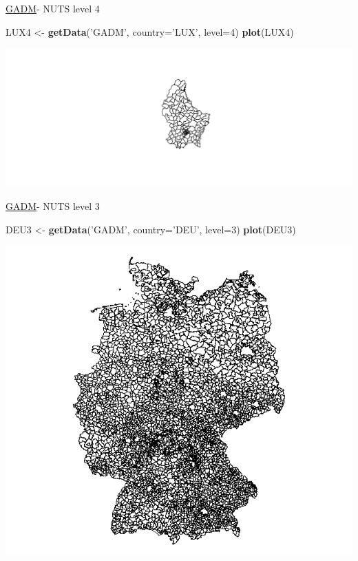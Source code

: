 \documentclass[ignorenonframetext,]{beamer}
\newenvironment{Shaded}{\begin{snugshade}}{\end{snugshade}}
\newcommand{\KeywordTok}[1]{\textcolor[rgb]{0.13,0.29,0.53}{\textbf{#1}}}
\newcommand{\DataTypeTok}[1]{\textcolor[rgb]{0.13,0.29,0.53}{#1}}
\newcommand{\DecValTok}[1]{\textcolor[rgb]{0.00,0.00,0.81}{#1}}
\newcommand{\StringTok}[1]{\textcolor[rgb]{0.31,0.60,0.02}{#1}}
\newcommand{\NormalTok}[1]{#1}
\begin{document}
\begin{frame}[fragile]{\href{http://www.gadm.org/}{GADM}- NUTS level 4}

\begin{Shaded}
\begin{Highlighting}[]
\NormalTok{LUX4 <-}\StringTok{ }\KeywordTok{getData}\NormalTok{(}\StringTok{'GADM'}\NormalTok{, }\DataTypeTok{country=}\StringTok{'LUX'}\NormalTok{, }\DataTypeTok{level=}\DecValTok{4}\NormalTok{)}
\KeywordTok{plot}\NormalTok{(LUX4)}
\end{Highlighting}
\end{Shaded}

\includegraphics{slides_all2gether_part1_files/figure-beamer/LUX4-1.pdf}

\end{frame}

\begin{frame}[fragile]{\href{http://www.gadm.org/}{GADM}- NUTS level 3}

\begin{Shaded}
\begin{Highlighting}[]
\NormalTok{DEU3 <-}\StringTok{ }\KeywordTok{getData}\NormalTok{(}\StringTok{'GADM'}\NormalTok{, }\DataTypeTok{country=}\StringTok{'DEU'}\NormalTok{, }\DataTypeTok{level=}\DecValTok{3}\NormalTok{)}
\KeywordTok{plot}\NormalTok{(DEU3)}
\end{Highlighting}
\end{Shaded}

\includegraphics{figure/DEU3.png}

\end{frame}
\end{document}
